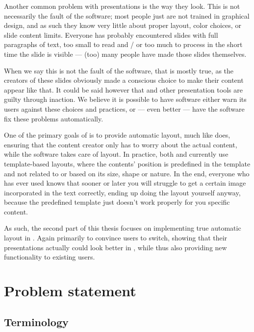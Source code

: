 \documentclass[a4paper,12pt]{report}
\begin{document}
  Another common problem with \ppt presentations is the way they look. This is
  not necessarily the fault of the software; most people just are not trained
  in graphical design, and as such they know very little about proper layout,
  color choices, or slide content limits. Everyone has probably encountered
  slides with full paragraphs of text, too small to read and / or too much to
  process in the short time the slide is visible --- (too) many people have
  made those slides themselves.

  When we say this is not the fault of the software, that is mostly true, as
  the creators of these slides obviously made a conscious choice to make their
  content appear like that. It could be said however that \ppt and other
  presentation tools are guilty through inaction. We believe it is possible to
  have software either warn its users against these choices and practices, or
  --- even better --- have the software fix these problems automatically.

  One of the primary goals of \mxp is to provide automatic layout, much like
  \latex does, ensuring that the content creator only has to worry about the
  actual content, while the software takes care of layout. In practice, both
  \latex and \mxp currently use template-based layouts, where the contents'
  position is predefined in the template and not related to or based on its
  size, shape or nature. In the end, everyone who has ever used \latex knows
  that sooner or later you will struggle to get a certain image incorporated in
  the text correctly, ending up doing the layout yourself anyway, because the
  predefined template just doesn't work properly for you specific content.

  As such, the second part of this thesis focuses on implementing true
  automatic layout in \mxp. Again primarily to convince \ppt users to switch,
  showing that their presentations actually could look better in \mxp, while
  thus also providing new functionality to existing \mxp users.

 \chapter{Problem statement}

  \section{Terminology}

  \section{\ppt}
\end{document}
